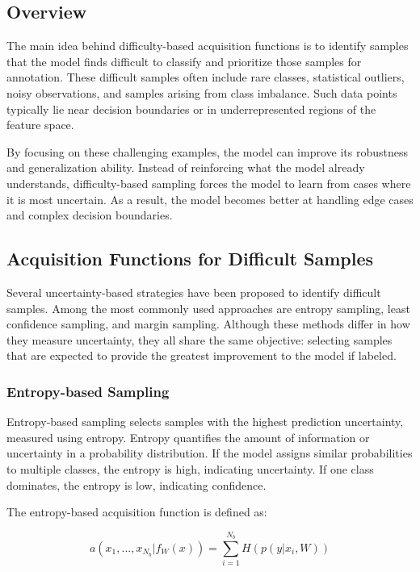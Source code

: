 \documentclass{article}
\begin{document}
\subsection{Overview}

The main idea behind difficulty-based acquisition functions is to identify samples that the model finds difficult to classify and prioritize those samples for annotation. These difficult samples often include rare classes, statistical outliers, noisy observations, and samples arising from class imbalance. Such data points typically lie near decision boundaries or in underrepresented regions of the feature space.

By focusing on these challenging examples, the model can improve its robustness and generalization ability. Instead of reinforcing what the model already understands, difficulty-based sampling forces the model to learn from cases where it is most uncertain. As a result, the model becomes better at handling edge cases and complex decision boundaries.

\subsection{Acquisition Functions for Difficult Samples}

Several uncertainty-based strategies have been proposed to identify difficult samples. Among the most commonly used approaches are entropy sampling, least confidence sampling, and margin sampling. Although these methods differ in how they measure uncertainty, they all share the same objective: selecting samples that are expected to provide the greatest improvement to the model if labeled.

\subsubsection{Entropy-based Sampling}

Entropy-based sampling selects samples with the highest prediction uncertainty, measured using entropy. Entropy quantifies the amount of information or uncertainty in a probability distribution. If the model assigns similar probabilities to multiple classes, the entropy is high, indicating uncertainty. If one class dominates, the entropy is low, indicating confidence.

The entropy-based acquisition function is defined as:

\begin{equation}
a(x_1, ..., x_{N_b} | f_W(x)) = \sum_{i=1}^{N_b} H(p(y|x_i, W))
\end{equation}
\end{document}

